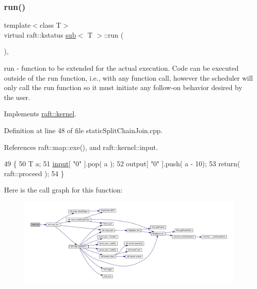 \subsubsection{\texorpdfstring{run()}{run()}\hspace{0.1cm}{\footnotesize\ttfamily [2/12]}}
{\footnotesize\ttfamily template$<$class T$>$ \\
virtual raft\+::kstatus \hyperlink{classsub}{sub}$<$ T $>$\+::run (\begin{DoxyParamCaption}{ }\end{DoxyParamCaption})\hspace{0.3cm}{\ttfamily [inline]}, {\ttfamily [virtual]}}

run -\/ function to be extended for the actual execution. Code can be executed outside of the run function, i.\+e., with any function call, however the scheduler will only call the run function so it must initiate any follow-\/on behavior desired by the user. 

Implements \hyperlink{classraft_1_1kernel_a05094286d7577360fb1b91c91fc05901}{raft\+::kernel}.



Definition at line 48 of file static\+Split\+Chain\+Join.\+cpp.



References raft\+::map\+::exe(), and raft\+::kernel\+::input.


\begin{DoxyCode}
49     \{
50         T a;
51         \hyperlink{classraft_1_1kernel_a6edbe35a56409d402e719b3ac36d6554}{input}[ \textcolor{stringliteral}{"0"} ].pop( a );
52         output[ \textcolor{stringliteral}{"0"} ].push( a - 10);
53         \textcolor{keywordflow}{return}( raft::proceed );
54     \}
\end{DoxyCode}
Here is the call graph for this function\+:
\nopagebreak
\begin{figure}[H]
\begin{center}
\leavevmode
\includegraphics[width=350pt]{classsub_a0a0c7461433ee8b5f4b24305282bf69a_cgraph}
\end{center}
\end{figure}
\hypertarget{classsub_a0a0c7461433ee8b5f4b24305282bf69a}{}\label{classsub_a0a0c7461433ee8b5f4b24305282bf69a} 
